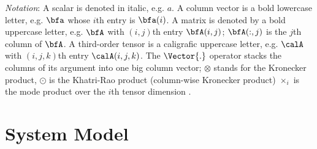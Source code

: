 \documentclass[conference]{IEEEtran}
\begin{document}


\textit{Notation}: A scalar is denoted in italic, e.g. $a$. A column vector is a
bold lowercase letter, e.g. $\bfa$ whose $i$th entry is $\bfa(i)$. A matrix is
denoted by a bold uppercase letter, e.g. $\bfA$ with $(i,j)$th entry
$\bfA(i,j)$; $\bfA(:,j)$ is the $j$th column of $\bfA$. A third-order tensor is
a caligrafic uppercase letter, e.g. $\calA$ with $(i,j,k)$th entry
$\calA(i,j,k)$. The $\Vector{.}$ operator stacks the columns of its argument
into one big column  vector; $\otimes$ stands for the Kronecker product,
$\odot$ is the Khatri-Rao product (column-wise Kronecker product)
$\times _i $ is the mode product over the $i$th tensor dimension  \cite{Sidiropoulos:2000,Kolda:2009}.
\section{System Model}
\end{document}
